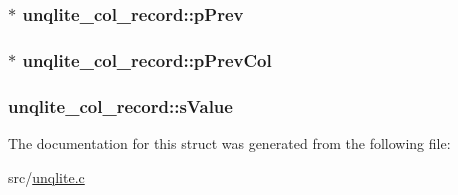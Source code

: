\hypertarget{structunqlite__col__record_a08427a1110990c5bfc876de687e64c04}{
\subsubsection[{p\-Prev}]{ $\ast$ unqlite\-\_\-col\-\_\-record\-::p\-Prev}}\label{db/d7a/structunqlite__col__record_a08427a1110990c5bfc876de687e64c04}
\hypertarget{structunqlite__col__record_af59521bf63b07eda93a8d0b52c4bfc9b}{
\subsubsection[{p\-Prev\-Col}]{ $\ast$ unqlite\-\_\-col\-\_\-record\-::p\-Prev\-Col}}\label{db/d7a/structunqlite__col__record_af59521bf63b07eda93a8d0b52c4bfc9b}
\hypertarget{structunqlite__col__record_a41d1da545c94450feb7aaf7f406871ca}{
\subsubsection[{s\-Value}]{ unqlite\-\_\-col\-\_\-record\-::s\-Value}}\label{db/d7a/structunqlite__col__record_a41d1da545c94450feb7aaf7f406871ca}


The documentation for this struct was generated from the following file\-:\begin{DoxyCompactItemize}
\item 
src/\hyperlink{unqlite_8c}{unqlite.\-c}\end{DoxyCompactItemize}
